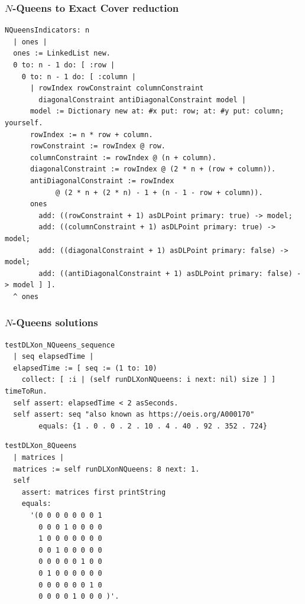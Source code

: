\documentclass[10pt]{beamer}
\begin{document}
\begin{frame}[fragile]
\frametitle{$N$-Queens to Exact Cover reduction}
\begin{verbatim}
NQueensIndicators: n
  | ones |
  ones := LinkedList new.
  0 to: n - 1 do: [ :row | 
    0 to: n - 1 do: [ :column | 
      | rowIndex rowConstraint columnConstraint 
        diagonalConstraint antiDiagonalConstraint model |
      model := Dictionary new at: #x put: row; at: #y put: column; yourself.
      rowIndex := n * row + column.
      rowConstraint := rowIndex @ row.
      columnConstraint := rowIndex @ (n + column).
      diagonalConstraint := rowIndex @ (2 * n + (row + column)).
      antiDiagonalConstraint := rowIndex
            @ (2 * n + (2 * n) - 1 + (n - 1 - row + column)).
      ones
        add: ((rowConstraint + 1) asDLPoint primary: true) -> model;
        add: ((columnConstraint + 1) asDLPoint primary: true) -> model;
        add: ((diagonalConstraint + 1) asDLPoint primary: false) -> model;
        add: ((antiDiagonalConstraint + 1) asDLPoint primary: false) -> model ] ].
  ^ ones
\end{verbatim}
\end{frame}

\begin{frame}[fragile]
\frametitle{$N$-Queens solutions}
\begin{verbatim}
testDLXon_NQueens_sequence
  | seq elapsedTime |
  elapsedTime := [ seq := (1 to: 10)
    collect: [ :i | (self runDLXonNQueens: i next: nil) size ] ] timeToRun.
  self assert: elapsedTime < 2 asSeconds.
  self assert: seq "also known as https://oeis.org/A000170"
        equals: {1 . 0 . 0 . 2 . 10 . 4 . 40 . 92 . 352 . 724}
\end{verbatim}
\begin{verbatim}
testDLXon_8Queens
  | matrices |
  matrices := self runDLXonNQueens: 8 next: 1.
  self
    assert: matrices first printString
    equals:
      '(0 0 0 0 0 0 0 1
        0 0 0 1 0 0 0 0
        1 0 0 0 0 0 0 0
        0 0 1 0 0 0 0 0
        0 0 0 0 0 1 0 0
        0 1 0 0 0 0 0 0
        0 0 0 0 0 0 1 0
        0 0 0 0 1 0 0 0 )'.
\end{verbatim}

\end{frame}
\end{document}
